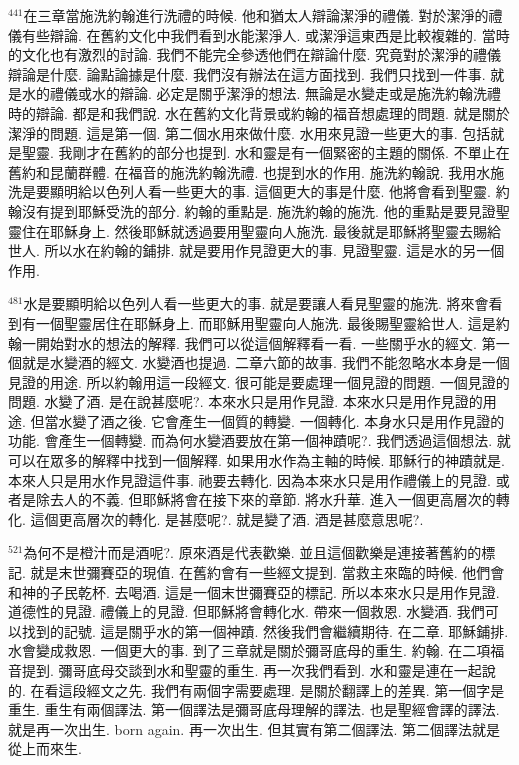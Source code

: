 \documentclass{book}
\begin{document}
$^{441}$在三章當施洗約翰進行洗禮的時候.
他和猶太人辯論潔淨的禮儀.
對於潔淨的禮儀有些辯論.
在舊約文化中我們看到水能潔淨人.
或潔淨這東西是比較複雜的.
當時的文化也有激烈的討論.
我們不能完全參透他們在辯論什麼.
究竟對於潔淨的禮儀辯論是什麼.
論點論據是什麼.
我們沒有辦法在這方面找到.
我們只找到一件事.
就是水的禮儀或水的辯論.
必定是關乎潔淨的想法.
無論是水變走或是施洗約翰洗禮時的辯論.
都是和我們說.
水在舊約文化背景或約翰的福音想處理的問題.
就是關於潔淨的問題.
這是第一個.
第二個水用來做什麼.
水用來見證一些更大的事.
包括就是聖靈.
我剛才在舊約的部分也提到.
水和靈是有一個緊密的主題的關係.
不單止在舊約和昆蘭群體.
在福音的施洗約翰洗禮.
也提到水的作用.
施洗約翰說.
我用水施洗是要顯明給以色列人看一些更大的事.
這個更大的事是什麼.
他將會看到聖靈.
約翰沒有提到耶穌受洗的部分.
約翰的重點是.
施洗約翰的施洗.
他的重點是要見證聖靈住在耶穌身上.
然後耶穌就透過要用聖靈向人施洗.
最後就是耶穌將聖靈去賜給世人.
所以水在約翰的鋪排.
就是要用作見證更大的事.
見證聖靈.
這是水的另一個作用.

$^{481}$水是要顯明給以色列人看一些更大的事.
就是要讓人看見聖靈的施洗.
將來會看到有一個聖靈居住在耶穌身上.
而耶穌用聖靈向人施洗.
最後賜聖靈給世人.
這是約翰一開始對水的想法的解釋.
我們可以從這個解釋看一看.
一些關乎水的經文.
第一個就是水變酒的經文.
水變酒也提過.
二章六節的故事.
我們不能忽略水本身是一個見證的用途.
所以約翰用這一段經文.
很可能是要處理一個見證的問題.
一個見證的問題.
水變了酒.
是在說甚麼呢?.
本來水只是用作見證.
本來水只是用作見證的用途.
但當水變了酒之後.
它會產生一個質的轉變.
一個轉化.
本身水只是用作見證的功能.
會產生一個轉變.
而為何水變酒要放在第一個神蹟呢?.
我們透過這個想法.
就可以在眾多的解釋中找到一個解釋.
如果用水作為主軸的時候.
耶穌行的神蹟就是.
本來人只是用水作見證這件事.
祂要去轉化.
因為本來水只是用作禮儀上的見證.
或者是除去人的不義.
但耶穌將會在接下來的章節.
將水升華.
進入一個更高層次的轉化.
這個更高層次的轉化.
是甚麼呢?.
就是變了酒.
酒是甚麼意思呢?.

$^{521}$為何不是橙汁而是酒呢?.
原來酒是代表歡樂.
並且這個歡樂是連接著舊約的標記.
就是末世彌賽亞的現值.
在舊約會有一些經文提到.
當救主來臨的時候.
他們會和神的子民乾杯.
去喝酒.
這是一個末世彌賽亞的標記.
所以本來水只是用作見證.
道德性的見證.
禮儀上的見證.
但耶穌將會轉化水.
帶來一個救恩.
水變酒.
我們可以找到的記號.
這是關乎水的第一個神蹟.
然後我們會繼續期待.
在二章.
耶穌鋪排.
水會變成救恩.
一個更大的事.
到了三章就是關於彌哥底母的重生.
約翰.
在二項福音提到.
彌哥底母交談到水和聖靈的重生.
再一次我們看到.
水和靈是連在一起說的.
在看這段經文之先.
我們有兩個字需要處理.
是關於翻譯上的差異.
第一個字是重生.
重生有兩個譯法.
第一個譯法是彌哥底母理解的譯法.
也是聖經會譯的譯法.
就是再一次出生.
born again.
再一次出生.
但其實有第二個譯法.
第二個譯法就是從上而來生.
\end{document}
